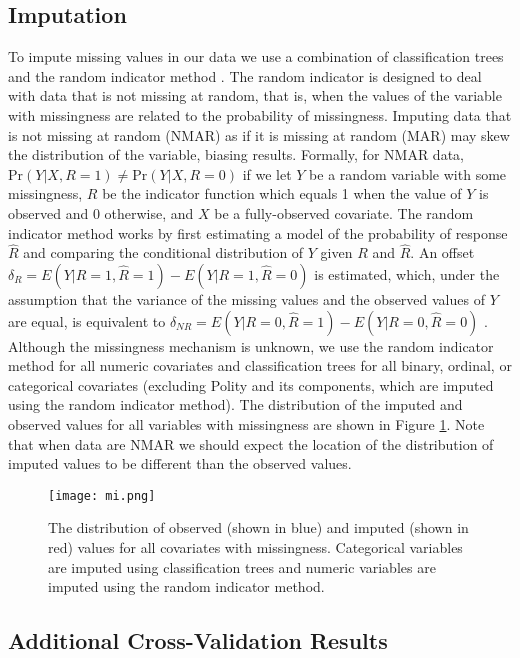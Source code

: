 \documentclass[12pt]{article}
\begin{document}
\subsection{Imputation}

To impute missing values in our data we use a combination of classification trees and the random indicator method \citep{buuren2011mice,jolani2012}. The random indicator is designed to deal with data that is not missing at random, that is, when the values of the variable with missingness are related to the probability of missingness. Imputing data that is not missing at random (NMAR) as if it is missing at random (MAR) may skew the distribution of the variable, biasing results. Formally, for NMAR data, $\text{Pr}(Y|X, R=1) \neq \text{Pr}(Y|X, R=0)$ if we let $Y$ be a random variable with some missingness, $R$ be the indicator function which equals 1 when the value of $Y$ is observed and 0 otherwise, and $X$ be a fully-observed covariate. The random indicator method works by first estimating a model of the probability of response $\hat{R}$ and comparing the conditional distribution of $Y$ given $R$ and $\hat{R}$. An offset $\delta_R = E(Y|R=1,\hat{R}=1) - E(Y|R=1,\hat{R}=0)$ is estimated, which, under the assumption that the variance of the missing values and the observed values of $Y$ are equal, is equivalent to $\delta_{NR} = E(Y|R=0,\hat{R}=1) - E(Y|R=0,\hat{R}=0)$ \citep{jolani2012}. Although the missingness mechanism is unknown, we use the random indicator method for all numeric covariates and classification trees for all binary, ordinal, or categorical covariates (excluding Polity and its components, which are imputed using the random indicator method). The distribution of the imputed and observed values for all variables with missingness are shown in Figure \ref{fig:mi}. Note that when data are NMAR we should expect the location of the distribution of imputed values to be different than the observed values.

\begin{figure}[!htpb]
\centering
\texttt{[image: mi.png]}
\caption{The distribution of observed (shown in blue) and imputed (shown in red) values for all covariates with missingness. Categorical variables are imputed using classification trees and numeric variables are imputed using the random indicator method.}
\label{fig:mi}
\end{figure}

\clearpage

\subsection{Additional Cross-Validation Results}
\end{document}
